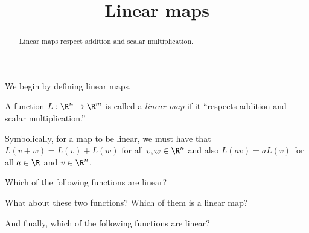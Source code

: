 \documentclass{ximera}
\title{Linear maps}
\begin{document}
\begin{abstract}
  Linear maps respect addition and scalar multiplication.
\end{abstract}

We begin by defining linear maps.

\begin{definition}
  A function $L: \R^n \to \R^m$ is called a \textit{linear map} if it
  ``respects addition and scalar multiplication.''

  Symbolically, for a map to be linear, we must have that $L(v+w) =
  L(v)+L(w)$ for all $v,w \in \R^n$ and also $L(av) = a L(v)$ for all
  $a \in \R$ and $v\in \R^n$.
\end{definition}

\begin{question}
  Which of the following functions are linear?
  \begin{solution}
    \begin{multiple-choice}

    \end{multiple-choice}
  \end{solution}

  What about these two functions?  Which of them is a linear map?
  \begin{solution}
    \begin{multiple-choice}
    \end{multiple-choice}
  \end{solution}

  And finally, which of the following functions are linear?
  \begin{solution}
    \begin{multiple-choice}
    \end{multiple-choice}
  \end{solution}


\end{question}
\end{document}
